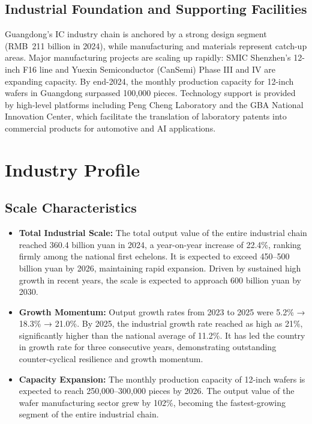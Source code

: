 \documentclass[12pt,a4paper]{article}
\begin{document}
\subsection{Industrial Foundation and Supporting Facilities}
\label{sec:infrastructure}

Guangdong's IC industry chain is anchored by a strong design segment (RMB~211 billion
in 2024), while manufacturing and materials represent catch-up areas. Major
manufacturing projects are scaling up rapidly: SMIC Shenzhen's 12-inch F16 line
and Yuexin Semiconductor (CanSemi) Phase III and IV are expanding capacity. By
end-2024, the monthly production capacity for 12-inch wafers in Guangdong
surpassed 100,000 pieces. Technology support is provided by high-level platforms
including Peng Cheng Laboratory and the GBA National Innovation Center, which
facilitate the translation of laboratory patents into commercial products for
automotive and AI applications.

\section{Industry Profile}
\label{sec:industry}

\subsection{Scale Characteristics}
\label{sec:scale}

\begin{itemize}
    \item \textbf{Total Industrial Scale:} The total output value of the entire
    industrial chain reached 360.4 billion yuan in 2024, a year-on-year increase
    of 22.4\%, ranking firmly among the national first echelons. It is expected to
    exceed 450--500 billion yuan by 2026, maintaining rapid expansion. Driven by
    sustained high growth in recent years, the scale is expected to approach 600
    billion yuan by 2030.
    \item \textbf{Growth Momentum:} Output growth rates from 2023 to 2025 were
    5.2\% → 18.3\% → 21.0\%. By 2025, the industrial growth rate reached as
    high as 21\%, significantly higher than the national average of 11.2\%.
    It has led the country in growth rate for three consecutive years,
    demonstrating outstanding counter-cyclical resilience and growth momentum.
    \item \textbf{Capacity Expansion:} The monthly production capacity of 12-inch
    wafers is expected to reach 250,000--300,000 pieces by 2026. The output value
    of the wafer manufacturing sector grew by 102\%, becoming the fastest-growing
    segment of the entire industrial chain.
\end{itemize}
\end{document}

